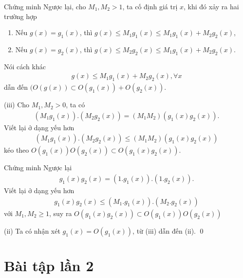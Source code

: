 \documentclass[9pt]{beamer}
\begin{document}
\begin{frame}
    \begin{exampleblock}{Chứng minh}
    Ngược lại, cho $M_1, M_2 > 1$, ta cố định giá trị $x$, khi đó xảy ra hai trường hợp
    \begin{enumerate}[label=+]
        \item Nếu $g(x) = g_1(x)$, thì $g(x) \le M_1 g_1(x) \le M_1 g_1(x) + M_2 g_2(x)$,
        \item Nếu $g(x) = g_2(x)$, thì $g(x) \le M_2 g_2(x) \le M_1 g_1(x) + M_2 g_2(x)$.
    \end{enumerate}
    Nói cách khác
    \begin{align*}
        g(x) \le M_1 g_1(x) + M_2 g_2(x), \forall x
    \end{align*}
    dẫn đến $(O(g(x)) \subset O(g_1(x)) + O(g_2(x))$.
    
    \noindent (iii) Cho $M_1, M_2 > 0$, ta có
    \begin{align*}
        (M_1 g_1(x)) . (M_2 g_2(x)) = (M_1 M_2) (g_1(x) g_2(x)).
    \end{align*}
    Viết lại ở dạng yếu hơn
    \begin{align*}
        (M_1 g_1(x)) . (M_2 g_2(x)) \le (M_1 M_2) (g_1(x) g_2(x))
    \end{align*}
    kéo theo $O(g_1(x)) O(g_2(x)) \subset O(g_1(x) g_2(x))$.
    \end{exampleblock}
\end{frame}

\begin{frame}
    \begin{exampleblock}{Chứng minh}
    Ngược lại
    \begin{align*}
        g_1(x) g_2(x) = (1 . g_1(x)) . (1 . g_2(x)).
    \end{align*}
    Viết lại ở dạng yếu hơn
    \begin{align*}
        g_1(x) g_2(x) \le (M_1. g_1(x)) . (M_2. g_2(x))
    \end{align*}
    với $M_1, M_2 \ge 1$, suy ra $O(g_1(x) g_2(x)) \subset O(g_1(x)) O(g_2(x))$
    
    \noident (ii) Ta có nhận xét $g_1(x) = O(g_1(x))$, từ (iii) dẫn đến (ii). \hfill \qed
    \end{exampleblock}
\end{frame}

\section{Bài tập lần 2}
\end{document}
